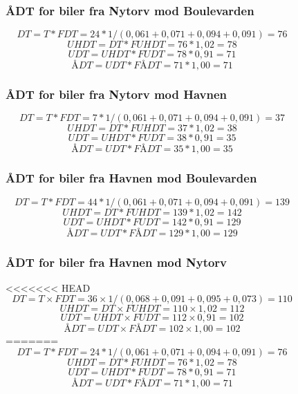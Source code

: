 \begin{figure}[htbp]
\subsubsection{ÅDT for biler fra Nytorv mod Boulevarden}
$$DT = T * FDT = 24 * 1/(0,061+0,071+0,094+0,091) = 76$$
$$UHDT = DT * FUHDT = 76 * 1,02 = 78$$
$$UDT = UHDT * FUDT = 78 * 0,91 = 71$$
$$ÅDT = UDT * FÅDT = 71 * 1,00 = 71$$
\subsubsection{ÅDT for biler fra Nytorv mod Havnen}
$$DT = T * FDT = 7 * 1/(0,061+0,071+0,094+0,091) = 37$$
$$UHDT = DT * FUHDT = 37 * 1,02 = 38$$
$$UDT = UHDT * FUDT = 38 * 0,91 = 35$$
$$ÅDT = UDT * FÅDT = 35 * 1,00 = 35$$
\subsubsection{ÅDT for biler fra Havnen mod Boulevarden}
$$DT = T * FDT = 44 * 1/(0,061+0,071+0,094+0,091) = 139$$
$$UHDT = DT * FUHDT = 139 * 1,02 = 142$$
$$UDT = UHDT * FUDT = 142 * 0,91 = 129$$
$$ÅDT = UDT * FÅDT = 129 * 1,00 = 129$$
\subsubsection{ÅDT for biler fra Havnen mod Nytorv}
<<<<<<< HEAD
$$DT = T \times FDT = 36 \times 1/(0,068+0,091+0,095+0,073) = 110$$
$$UHDT = DT \times FUHDT = 110 \times 1,02 = 112$$
$$UDT = UHDT \times FUDT = 112 \times 0,91 = 102$$
$$ÅDT = UDT \times FÅDT = 102 \times 1,00 = 102$$
=======
$$DT = T * FDT = 24 * 1/(0,061+0,071+0,094+0,091) = 76$$
$$UHDT = DT * FUHDT = 76 * 1,02 = 78$$
$$UDT = UHDT * FUDT = 78 * 0,91 = 71$$
$$ÅDT = UDT * FÅDT = 71 * 1,00 = 71$$


\end{figure}
